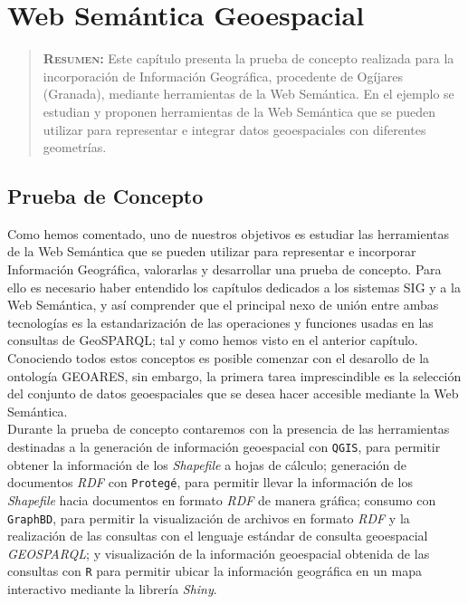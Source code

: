 \chapter{Web Semántica Geoespacial}
\label{ch:aplicacion}

\begin{quote}
	{\bf\textsc{Resumen:}} Este capítulo presenta la prueba de concepto realizada para la incorporación de Información Geográfica, procedente de Ogíjares (Granada), mediante herramientas de la Web Semántica. En el ejemplo se estudian y proponen herramientas de la Web Semántica que se pueden utilizar para representar e integrar datos geoespaciales con diferentes geometrías.
\end{quote}



\section{Prueba de Concepto}

Como hemos comentado, uno de nuestros objetivos es estudiar las herramientas de la Web Semántica que se pueden utilizar para representar e incorporar Información Geográfica, valorarlas y desarrollar una prueba de concepto. Para ello es necesario haber entendido los capítulos dedicados a los sistemas SIG y a la Web Semántica, y así comprender que el principal nexo de unión entre ambas tecnologías es la estandarización de las operaciones y funciones usadas en las consultas de GeoSPARQL; tal y como hemos visto en el anterior capítulo. Conociendo todos estos conceptos es posible comenzar con el desarollo de la ontología GEOARES, sin embargo, la primera tarea imprescindible es la selección del conjunto de datos geoespaciales que se desea hacer accesible mediante la Web Semántica. \\

Durante la prueba de concepto contaremos con la presencia de las herramientas destinadas a la generación de información geoespacial con \texttt{QGIS}, para permitir obtener la información de los \textit{Shapefile} a hojas de cálculo; generación de documentos \textit{RDF} con \texttt{Protegé}, para permitir llevar la información de los \textit{Shapefile} hacia documentos en formato \textit{RDF} de manera gráfica; consumo con \texttt{GraphBD},  para permitir la visualización de archivos en formato \textit{RDF} y la realización de las consultas con el lenguaje estándar de consulta geoespacial \textit{GEOSPARQL}; y visualización de la información geoespacial obtenida de las consultas con \texttt{R} para permitir ubicar la información geográfica en un mapa interactivo mediante la librería \textit{Shiny}.\\


